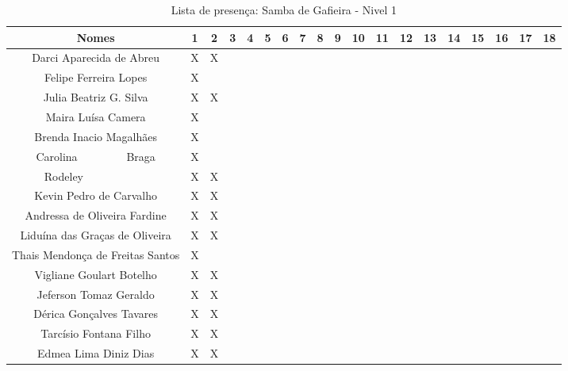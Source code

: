 \documentclass[12pt]{report}
\begin{document}
\begin{landscape}
\begin{table}[!htbp]
\vspace*{-3cm}\centering
\caption{Lista de presença: Samba de Gafieira - Nivel 1}
\begin{tabular}{|*{19}{c|}}
\hline%
 Nomes & 1 & 2 & 3 & 4 & 5 & 6 & 7 & 8 & 9 & 10 & 11 & 12 & 13 & 14 & 15 & 16 & 17 & 18 \\ \hline
 
 Darci Aparecida de Abreu           &X &X &  &  &  &  &  &  &  &  &  &  &  &  &  &  &  &  \\ \hline
 Felipe Ferreira Lopes              &X &  &  &  &  &  &  &  &  &  &  &  &  &  &  &  &  &  \\ \hline
 Julia Beatriz G. Silva             &X &X &  &  &  &  &  &  &  &  &  &  &  &  &  &  &  &  \\ \hline
 Maira Luísa Camera                 &X &  &  &  &  &  &  &  &  &  &  &  &  &  &  &  &  &  \\ \hline
 Brenda Inacio Magalhães            &X &  &  &  &  &  &  &  &  &  &  &  &  &  &  &  &  &  \\ \hline
 Carolina$~~~~~~~~~~~~~~~~~~~~$Braga&X &  &  &  &  &  &  &  &  &  &  &  &  &  &  &  &  &  \\ \hline
 Rodeley$~~~~~~~~~~~~~~~~~~~~~~~~~~$&X &X &  &  &  &  &  &  &  &  &  &  &  &  &  &  &  &  \\ \hline
 Kevin Pedro de Carvalho            &X &X &  &  &  &  &  &  &  &  &  &  &  &  &  &  &  &  \\ \hline
 Andressa de Oliveira Fardine       &X &X &  &  &  &  &  &  &  &  &  &  &  &  &  &  &  &  \\ \hline
 Liduína das Graças de Oliveira     &X &X &  &  &  &  &  &  &  &  &  &  &  &  &  &  &  &  \\ \hline
 Thais Mendonça de Freitas Santos   &X &  &  &  &  &  &  &  &  &  &  &  &  &  &  &  &  &  \\ \hline
 Vigliane Goulart Botelho           &X &X &  &  &  &  &  &  &  &  &  &  &  &  &  &  &  &  \\ \hline
 Jeferson Tomaz Geraldo             &X &X &  &  &  &  &  &  &  &  &  &  &  &  &  &  &  &  \\ \hline
 Dérica Gonçalves Tavares           &X &X &  &  &  &  &  &  &  &  &  &  &  &  &  &  &  &  \\ \hline
 Tarcísio Fontana Filho             &X &X &  &  &  &  &  &  &  &  &  &  &  &  &  &  &  &  \\ \hline
 Edmea Lima Diniz Dias              &X &X &  &  &  &  &  &  &  &  &  &  &  &  &  &  &  &  \\ \hline

\end{tabular}
\end{table}
\end{landscape}
\end{document}
